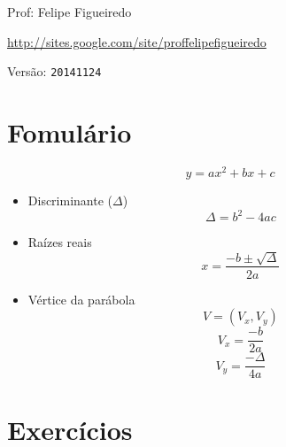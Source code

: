 \documentclass[a4paper]{article}
\begin{document}
\parbox[c]{.825\textwidth}{\raggedright%
{Prof: Felipe Figueiredo\par}
{\url{http://sites.google.com/site/proffelipefigueiredo}}
}

Versão: \verb|20141124|




\section{Fomulário}

\begin{displaymath}
  y = a x^2 + b x + c
\end{displaymath}

\begin{itemize}
\item Discriminante ($\Delta$)
  \begin{displaymath}
    \Delta = b^2 - 4ac
  \end{displaymath}

\item Raízes reais
  \begin{displaymath}
    x = \frac{-b \pm \sqrt{\Delta}}{2a}
  \end{displaymath}

\item Vértice da parábola
  \begin{displaymath}
    V = (V_x, V_y)
  \end{displaymath}
  \begin{displaymath}
  V_x = \frac{-b}{2a}    
  \end{displaymath}
  \begin{displaymath}
    V_y = \frac{-\Delta}{4a}
  \end{displaymath}

\end{itemize}

\section{Exercícios}
\end{document}
